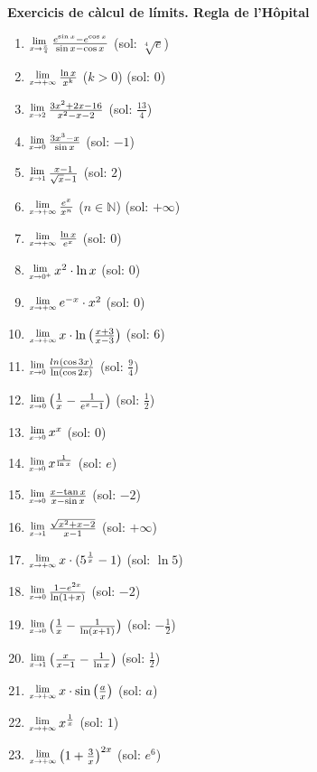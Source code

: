 \documentclass{article}
\newcommand{\Lim}[1]{\raisebox{0.5ex}{\scalebox{0.8}{$\displaystyle \lim_{#1}\;$}}}
\begin{document}
	\author{Mireia Dosil}
	\date{text}



\textbf{Exercicis de càlcul de límits. Regla de l'Hôpital}



\begin{enumerate}
	\item $\Lim{x \rightarrow \frac{\pi}{4}} \frac{e^{\sin x}-e^{\cos x}}{\sin x- \cos x}$ (sol: $\sqrt[4]{e}$)
\item $\Lim{x \rightarrow +\infty} \frac{\ln x}{x^k}$ ($k>0$) (sol: $0$)	
\item $\Lim{x \rightarrow 2} \frac{3x^2+2x-16}{x^2-x-2}$ (sol: $\frac{13}{4}$)
\item $\Lim{x \rightarrow 0} \frac{3x^3-x}{\sin x}$ (sol: $-1$)
\item $\Lim{x \rightarrow 1} \frac{x-1}{\sqrt{x}-1}$ (sol: $2$)
\item $\Lim{x \rightarrow +\infty} \frac{e^x}{x^n}$ ($n \in \mathbb{N}$) (sol: $+\infty$)
\item $\Lim{x \rightarrow +\infty} \frac{\ln x}{e^x}$ (sol: $0$)
\item $\Lim{x \rightarrow 0^+} x^2\cdot \ln x$ (sol: $0$)
\item $\Lim{x \rightarrow +\infty} e^{-x}\cdot x^2$ (sol: $0$)
\item $\Lim{x \rightarrow +\infty} x \cdot \ln \big(\frac{x+3}{x-3}\big)$ (sol: $6$)
\item $\Lim{x \rightarrow 0} \frac{ln(\cos 3x)}{\ln (\cos 2x)}$ (sol: $\frac{9}{4}$)
\item $\Lim{x \rightarrow 0} \big(\frac{1}{x}-\frac{1}{e^x-1}\big)$ (sol: $\frac{1}{2}$)
\item $\Lim{x \rightarrow 0} x^x$ (sol: $0$)
\item $\Lim{x \rightarrow 0} x^{\frac{1}{\ln x}}$ (sol: $e$)
\item $\Lim{x \rightarrow 0} \frac{x-\tan x}{x-\sin x}$ (sol: $-2$)
\item $\Lim{x \rightarrow 1} \frac{\sqrt{x^2+x-2}}{x-1}$ (sol: $+\infty$)
\item $\Lim{x \rightarrow +\infty} x\cdot (5^{\frac{1}{x}}-1)$ (sol: $\ln 5$)
\item $\Lim{x \rightarrow 0} \frac{1-e^{2x}}{\ln(1+x)}$ (sol: $-2$)
\item $\Lim{x \rightarrow 0} \big(\frac{1}{x}-\frac{1}{\ln (x+1)}\big)$ (sol: $-\frac{1}{2}$)
\item $\Lim{x \rightarrow 1} \big(\frac{x}{x-1}-\frac{1}{\ln x}\big)$ (sol: $\frac{1}{2}$)
\item $\Lim{x \rightarrow + \infty} x \cdot \sin\big( \frac{a}{x} \big)$ (sol: $a$)
\item $\Lim{x \rightarrow + \infty} x^{\frac{1}{x}}$ (sol: $1$)
\item $\Lim{x \rightarrow + \infty} \big(1+\frac{3}{x}\big)^{2x}$ (sol: $e^6$)

	


\end{enumerate}
 
\end{document}
